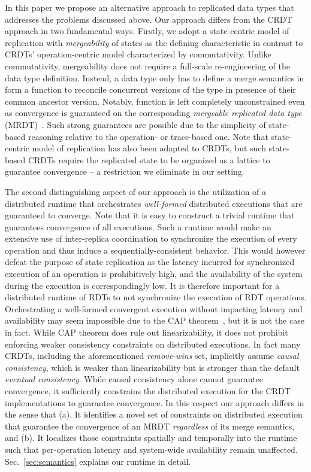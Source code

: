 In this paper we propose an alternative approach to replicated data types
that addresses the problems discussed above. Our approach differs from the
CRDT approach in two fundamental ways. Firstly, we adopt a state-centric
model of replication with \emph{mergeability} of states as the defining
characteristic in contrast to CRDTs' operation-centric model characterized
by commutativity. Unlike commutativity, mergeability does not require a
full-scale re-engineering of the data type definition. Instead,
a data type only has to define a merge semantics in form a 
function to reconcile concurrent versions of the type in presence of their
common ancestor version. Notably,  function is left completely
unconstrained even as convergence is guaranteed on the corresponding
\emph{mergeable replicated data type} (MRDT)~\cite{mrdt}. Such strong
guarantees are possible due to the simplicity of state-based reasoning
relative to the operation- or trace-based one. Note that state-centric
model of replication has also been adapted to CRDTs, but such state-based
CRDTs require the replicated state to be organized as a lattice to
guarantee convergence -- a restriction we eliminate in our setting. 

The second distinguishing aspect of our approach is the utilization of a
distributed runtime that orchestrates \emph{well-formed} distributed
executions that are guaranteed to converge. Note that it is easy to
construct a trivial runtime that guarantees convergence of all executions.
Such a runtime would make an extensive use of inter-replica coordination to
synchronize the execution of every operation and thus induce a
sequentially-consistent behavior. This would however defeat the purpose of
state replication as the latency incurred for synchronized execution of an
operation is prohibitively high, and the availability of the system during
the execution is correspondingly low. It is therefore important for a
distributed runtime of RDTs to not synchronize the execution of RDT
operations. Orchestrating a well-formed convergent execution without
impacting latency and availability may seem impossible due to the CAP
theorem~\cite{cap}, but it is not the case in fact. While CAP theorem does
rule out linearizability, it does not prohibit enforcing weaker consistency
constraints on distributed executions. In fact many CRDTs, including the
aforementioned \emph{remove-wins} set, implicitly assume \emph{causal
consistency}, which is weaker than linearizability but is stronger than the
default \emph{eventual consistency}. While causal consistency alone cannot
guarantee convergence, it sufficiently constrains the distributed execution
for the CRDT implementations to guarantee convergence. In this respect our
approach differs in the sense that (a). It identifies a novel set of
constraints on distributed execution that guarantee the convergence of an
MRDT \emph{regardless} of its merge semantics, and (b). It localizes those
constraints spatially and temporally into the runtime such that
per-operation latency and system-wide availability remain unaffected.
Sec.~\ref{sec:semantics} explains our runtime in detail. 

